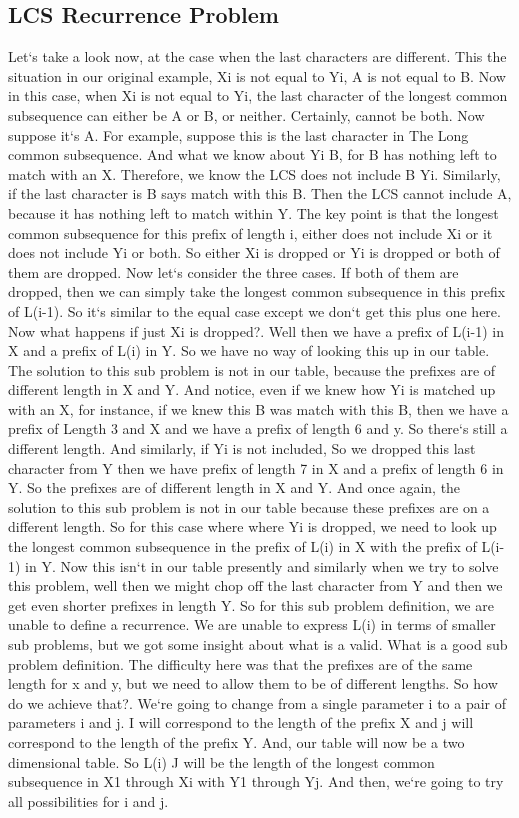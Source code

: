 \subsection{LCS  Recurrence Problem}
Let`s take a look now, at the case when the last characters are different.
This the situation in our original example, Xi is not equal to Yi, A is not equal to B\@.
Now in this case, when Xi is not equal to Yi, the last character of the longest common subsequence can either be A or B, or neither.
Certainly, cannot be both.
Now suppose it`s A\@.
For example, suppose this is the last character in The Long common subsequence.
And what we know about Yi B, for B has nothing left to match with an X\@.
Therefore, we know the LCS does not include B Yi.
Similarly, if the last character is B says match with this B\@.
Then the LCS cannot include A, because it has nothing left to match within Y\@.
The key point is that the longest common subsequence for this prefix of length i, either does not include Xi or it does not include Yi or both.
So either Xi is dropped or Yi is dropped or both of them are dropped.
Now let`s consider the three cases.
If both of them are dropped, then we can simply take the longest common subsequence in this prefix of L(i-1).
So it`s similar to the equal case except we don`t get this plus one here.
Now what happens if just Xi is dropped?.
Well then we have a prefix of L(i-1) in X and a prefix of L(i) in Y\@.
So we have no way of looking this up in our table.
The solution to this sub problem is not in our table, because the prefixes are of different length in X and Y\@.
And notice, even if we knew how Yi is matched up with an X, for instance, if we knew this B was match with this B, then we have a prefix of Length 3 and X and we have a prefix of length 6 and y.
So there`s still a different length.
And similarly, if Yi is not included, So we dropped this last character from Y then we have prefix of length 7 in X and a prefix of length 6 in Y\@.
So the prefixes are of different length in X and Y\@.
And once again, the solution to this sub problem is not in our table because these prefixes are on a different length.
So for this case where where Yi is dropped, we need to look up the longest common subsequence in the prefix of L(i) in X with the prefix of L(i-1) in Y\@.
Now this isn`t in our table presently and similarly when we try to solve this problem, well then we might chop off the last character from Y and then we get even shorter prefixes in length Y\@.
So for this sub problem definition, we are unable to define a recurrence.
We are unable to express L(i) in terms of smaller sub problems, but we got some insight about what is a valid.
What is a good sub problem definition.
The difficulty here was that the prefixes are of the same length for x and y, but we need to allow them to be of different lengths.
So how do we achieve that?.
We`re going to change from a single parameter i to a pair of parameters i and j.
I will correspond to the length of the prefix X and j will correspond to the length of the prefix Y\@.
And, our table will now be a two dimensional table.
So L(i) J will be the length of the longest common subsequence in X1 through Xi with Y1 through Yj.
And then, we`re going to try all possibilities for i and j.

